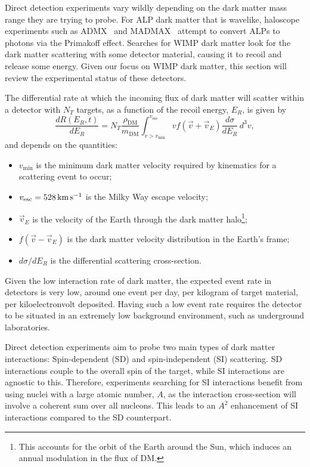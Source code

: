 Direct detection experiments vary wildly depending on the dark matter 
mass range they are trying to probe. For ALP dark matter that is wavelike, haloscope experiments 
such as ADMX~\cite{ADMX:2009iij_SQUIDbasedmicrowavecavity} and MADMAX~\cite{MADMAX:2019pub_mar_Newexperimentalapproach} 
attempt to convert ALPs to photons via the Primakoff effect. 
Searches for WIMP dark matter look for the dark matter scattering with some detector
material, causing it to recoil and release some energy. Given our focus on WIMP dark matter, 
this section will review the experimental status of these detectors.

The differential rate at which the incoming flux of dark matter will scatter
within a detector with $N_T$ targets, as a function of the recoil energy, $E_R$,
is given by
\begin{equation}
    \frac{d R(E_R, t)}{dE_R} = N_T \frac{\rho_\mathrm{DM}}{m_\mathrm{DM}}\int_{v>v_\mathrm{min}}^{v_\mathrm{esc}}v f(\Vec{v} + \vec{v}_E)\frac{d\sigma}{dE_R}\,d^3v,
\end{equation}
 and depends on the quantities:
\begin{itemize}
    \item $v_\mathrm{min}$ is the minimum dark matter velocity required by kinematics for a scattering event to occur;
    \item $v_\mathrm{esc} = 528{\rm \,km}{\rm \,s}^{-1}$ is the Milky Way escape velocity;
    \item $\vec{v}_E$ is the velocity of the Earth through the dark matter halo\footnote{This accounts for the orbit of the Earth around the Sun, which induces an annual modulation in the flux of DM.};
    \item $f(\vec{v} - \vec{v}_E)$ is the dark matter velocity distribution in the Earth's frame;
    \item $d\sigma/dE_R$ is the differential scattering cross-section.
\end{itemize}
Given the low interaction rate of dark matter, the expected event rate in 
detectors is very low, around one event per day, per kilogram of target material, per kiloelectronvolt deposited.
Having such a low event rate requires the detector to be situated in 
an extremely low background environment, such as underground laboratories. 

Direct detection experiments aim to probe two main types of dark matter interactions:
Spin-dependent (SD) and spin-independent (SI) scattering. SD interactions couple
to the overall spin of the target, while SI interactions are agnostic to this.
Therefore, experiments searching for SI interactions benefit from using nuclei with a large atomic number, $A$,
as the interaction cross-section will involve a coherent sum over all nucleons.
This leads to an $A^2$ enhancement of SI interactions compared to the SD counterpart.

